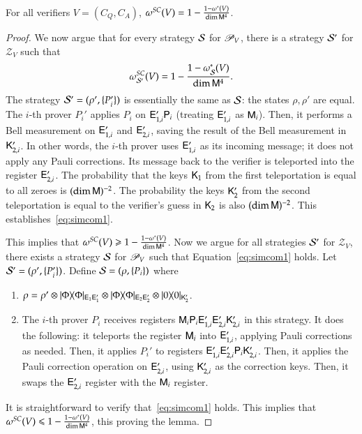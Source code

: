 \begin{lemma}
\label{lem:convert_to_simcom}
	For all verifiers $V = (C_Q,C_A)$, $\omega^{SC}(V) = 1 - \frac{1 - \omega^*(V)}{\dim {\mathsf{M}}^4}$. 
\end{lemma}
\begin{proof}
	We now argue that for every strategy $\mathcal{S}$ for $\mathscr{P}_V$, there is a strategy $\mathcal{S}'$ for $\mathscr{Z}_V$ such that
	\begin{equation}
	\label{eq:simcom1}
		\omega^{SC}_{\strat'}(V) = 1 - \frac{1 - \omega^*_\strat(V)}{\dim \sM^4}.
	\end{equation}
	The strategy $\mathcal{S}' = (\rho',\{P_i'\})$ is essentially the same as $\mathcal{S}$: the states $\rho,\rho'$ are equal. The $i$-th prover $P_i'$ applies $P_i$ on ${\mathsf{E}}_{1,i}' {\mathsf{P}}_i$ (treating ${\mathsf{E}}_{1,i}'$ as ${\mathsf{M}}_i$). Then, it performs a Bell measurement on ${\mathsf{E}}_{1,i}'$ and ${\mathsf{E}}_{2,i}'$, saving the result of the Bell measurement in ${\mathsf{K}}_{2,i}'$. In other words, the $i$-th prover uses ${\mathsf{E}}_{1,i}'$ as its incoming message; it does not apply any Pauli corrections. Its message back to the verifier is teleported into the register ${\mathsf{E}}_{2,i}'$. The probability that the keys ${\mathsf{K}}_1$ from the first teleportation is equal to all zeroes is $(\dim {\mathsf{M}})^{-2}$. The probability the keys ${\mathsf{K}}_2'$ from the second teleportation is equal to the verifier's guess in ${\mathsf{K}}_2$ is also $(\dim {\mathsf{M}})^{-2}$. This establishes~\eqref{eq:simcom1}.
	
	This implies that $\omega^{SC}(V) \geqslant 1 - \frac{1 - \omega^*(V)}{\dim {\mathsf{M}}^4}$. Now we argue for all strategies $\mathcal{S}'$ for $\mathscr{Z}_{V}$, there exists a strategy $\mathcal{S}$ for $\mathscr{P}_V$ such that Equation~\eqref{eq:simcom1} holds. Let $\mathcal{S}' = (\rho',\{ P_i' \})$. Define $\mathcal{S} = (\rho,\{P_i\})$ where
	\begin{enumerate}
		\item $\rho = \rho' \otimes |\Phi\rangle\! \langle \Phi|_{{\mathsf{E}}_1 {\mathsf{E}}_1'} \otimes |\Phi\rangle\! \langle \Phi|_{{\mathsf{E}}_2 {\mathsf{E}}_2'} \otimes |0\rangle\! \langle 0|_{{\mathsf{K}}_2'}$. 
		
		\item The $i$-th prover $P_i$ receives registers ${\mathsf{M}}_i {\mathsf{P}}_i {\mathsf{E}}_{1,i}' {\mathsf{E}}_{2,i}' {\mathsf{K}}_{2,i}'$ in this strategy. It does the following: it teleports the register ${\mathsf{M}}_i$ into ${\mathsf{E}}_{1,i}'$, applying Pauli corrections as needed. Then, it applies $P_i'$ to registers ${\mathsf{E}}_{1,i}' {\mathsf{E}}_{2,i}' {\mathsf{P}}_i {\mathsf{K}}_{2,i}'$. Then, it applies the Pauli correction operation on ${\mathsf{E}}_{2,i}'$, using ${\mathsf{K}}_{2,i}'$ as the correction keys. Then, it swaps the ${\mathsf{E}}_{2,i}'$ register with the ${\mathsf{M}}_i$ register. 
	\end{enumerate}
	It is straightforward to verify that~\eqref{eq:simcom1} holds.  This implies that $\omega^{SC}(V) \leqslant 1 - \frac{1 - \omega^*(V)}{\dim {\mathsf{M}}^4}$, this proving the lemma.
\end{proof}


